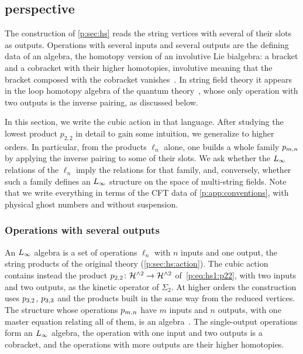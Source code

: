\subsection{\IBL{} perspective}
\label{p:sec:ibl}

The construction of \cref{p:sec:hs} reads the string vertices with several of their slots as outputs.
Operations with several inputs and several outputs are the defining data of an \IBL{} algebra, the homotopy version of an involutive Lie bialgebra: a bracket and a cobracket with their higher homotopies, involutive meaning that the bracket composed with the cobracket vanishes~\cite{Cieliebak:2015:HomologicalAlgebraRelated, Markl:2017:MVFormalismIBL}.
  In string field theory it appears in the loop homotopy algebra of the quantum theory~\cite{Markl:2001:LoopHomotopyAlgebras, Muenster:2013:QuantumOpenClosedHomotopy}, whose only operation with two outputs is the inverse pairing, as discussed below.

In this section, we write the cubic action in that language.
After studying the lowest product $p_{2,2}$ in detail to gain some intuition, we generalize to higher orders.
In particular, from the products $\ell_n$ alone, one builds a whole family $p_{m,n}$ by applying the inverse pairing to some of their slots.
We ask whether the $L_\infty$ relations of the $\ell_n$ imply the \IBL{} relations for that family, and, conversely, whether such a family defines an $L_\infty$ structure on the space of multi-string fields.
Note that we write everything in terms of the CFT data of \cref{p:app:conventions}, with physical ghost numbers and without suspension.


\subsubsection{Operations with several outputs}
\label{p:sec:ibl:operations}

An $L_\infty$ algebra is a set of operations $\ell_n$ with $n$ inputs and one output, the string products of the original theory (\cref{p:sec:hs:action}).
The cubic action contains instead the product $p_{2,2} \colon \mathcal{H}^{\wedge 2} \to \mathcal{H}^{\wedge 2}$ of~\eqref{p:eq:hs1:p22}, with two inputs and two outputs, as the kinetic operator of $\Sigma_2$.
At higher orders the construction uses $p_{3,2}$, $p_{3,3}$ and the products built in the same way from the reduced vertices.
The structure whose operations $p_{m,n}$ have $m$ inputs and $n$ outputs, with one master equation relating all of them, is an \IBL{} algebra~\cite{Cieliebak:2015:HomologicalAlgebraRelated}.
The single-output operations form an $L_\infty$ algebra, the operation with one input and two outputs is a cobracket, and the operations with more outputs are their higher homotopies.

